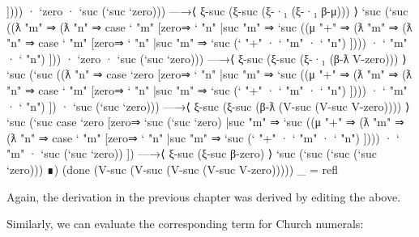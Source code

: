 \begin{fence}
\begin{code}
         ])))
      · `zero
      · `suc (`suc `zero)))
   —→⟨ ξ-suc (ξ-suc (ξ-·₁ (ξ-·₁ β-μ))) ⟩
    `suc
    (`suc
     ((ƛ "m" ⇒
       (ƛ "n" ⇒
        case ` "m" [zero⇒ ` "n" |suc "m" ⇒
        `suc
        ((μ "+" ⇒
          (ƛ "m" ⇒
           (ƛ "n" ⇒
            case ` "m" [zero⇒ ` "n" |suc "m" ⇒ `suc (` "+" · ` "m" · ` "n")
            ])))
         · ` "m"
         · ` "n")
        ]))
      · `zero
      · `suc (`suc `zero)))
   —→⟨ ξ-suc (ξ-suc (ξ-·₁ (β-ƛ V-zero))) ⟩
    `suc
    (`suc
     ((ƛ "n" ⇒
       case `zero [zero⇒ ` "n" |suc "m" ⇒
       `suc
       ((μ "+" ⇒
         (ƛ "m" ⇒
          (ƛ "n" ⇒
           case ` "m" [zero⇒ ` "n" |suc "m" ⇒ `suc (` "+" · ` "m" · ` "n")
           ])))
        · ` "m"
        · ` "n")
       ])
      · `suc (`suc `zero)))
   —→⟨ ξ-suc (ξ-suc (β-ƛ (V-suc (V-suc V-zero)))) ⟩
    `suc
    (`suc
     case `zero [zero⇒ `suc (`suc `zero) |suc "m" ⇒
     `suc
     ((μ "+" ⇒
       (ƛ "m" ⇒
        (ƛ "n" ⇒
         case ` "m" [zero⇒ ` "n" |suc "m" ⇒ `suc (` "+" · ` "m" · ` "n")
         ])))
      · ` "m"
      · `suc (`suc `zero))
     ])
   —→⟨ ξ-suc (ξ-suc β-zero) ⟩
    `suc (`suc (`suc (`suc `zero)))
   ∎)
   (done (V-suc (V-suc (V-suc (V-suc V-zero)))))
_ = refl
\end{code}
\end{fence}

Again, the derivation in the previous chapter was derived by editing the
above.

Similarly, we can evaluate the corresponding term for Church numerals:

